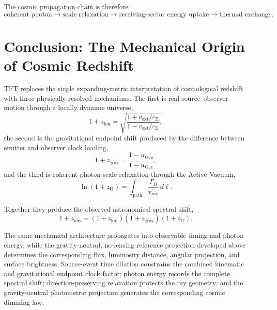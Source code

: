 The cosmic propagation chain is therefore
\begin{equation}
    \text{coherent photon}
    \longrightarrow
    \text{scale relaxation}
    \longrightarrow
    \text{receiving-sector energy uptake}
    \longrightarrow
    \text{thermal exchange}.
\end{equation}


\section{Conclusion: The Mechanical Origin of Cosmic Redshift}

TFT replaces the single expanding-metric interpretation of cosmological redshift with three physically resolved mechanisms. The first is real source--observer motion through a locally dynamic universe,
\begin{equation}
    1+z_{\mathrm{kin}}
    =
    \sqrt{
        \frac{
            1+v_{\mathrm{ext}}/c_{\mathrm E}
        }{
            1-v_{\mathrm{ext}}/c_{\mathrm E}
        }
    },
\end{equation}
the second is the gravitational endpoint shift produced by the difference between emitter and observer clock loading,
\begin{equation}
    1+z_{\mathrm{grav}}
    =
    \frac{
        1-\alpha_{\mathrm G,o}
    }{
        1-\alpha_{\mathrm G,e}
    },
\end{equation}
and the third is coherent photon scale relaxation through the Active Vacuum,
\begin{equation}
    \ln(1+z_{\mathrm D})
    =
    \int_{\mathrm{path}}
    \frac{
        \Gamma_{\mathrm D}
    }{
        v_{\mathrm{ray}}
    }
    \,d\ell.
\end{equation}

Together they produce the observed astronomical spectral shift,
\begin{equation}
    1+z_{\mathrm{obs}}
    =
    (1+z_{\mathrm{kin}})
    (1+z_{\mathrm{grav}})
    (1+z_{\mathrm D}).
\end{equation}

The same mechanical architecture propagates into observable timing and photon energy, while the gravity-neutral, no-lensing reference projection developed above determines the corresponding flux, luminosity distance, angular projection, and surface brightness. Source-event time dilation constrains the combined kinematic and gravitational endpoint clock factor; photon energy records the complete spectral shift; direction-preserving relaxation protects the ray geometry; and the gravity-neutral photometric projection generates the corresponding cosmic dimming law.

